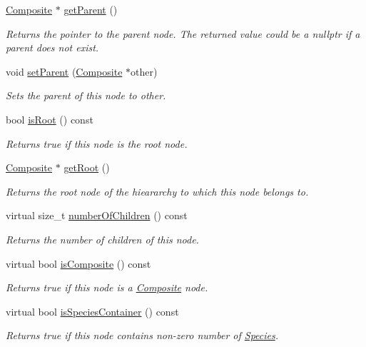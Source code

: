 \begin{DoxyCompactItemize}
\hyperlink{classComposite}{Composite} $\ast$ \hyperlink{classComponent_a4bb9041a7f3854f25f45060e81bb4e4e}{get\+Parent} ()
\begin{DoxyCompactList}\small\item\em Returns the pointer to the parent node. The returned value could be a nullptr if a parent does not exist. \end{DoxyCompactList}\item 
void \hyperlink{classComponent_a9d5b03697a653cda24d5688af1d105f8}{set\+Parent} (\hyperlink{classComposite}{Composite} $\ast$other)
\begin{DoxyCompactList}\small\item\em Sets the parent of this node to other. \end{DoxyCompactList}\item 
bool \hyperlink{classComponent_a4f0bed8144509d6565a30b548fac0fe7}{is\+Root} () const 
\begin{DoxyCompactList}\small\item\em Returns true if this node is the root node. \end{DoxyCompactList}\item 
\hyperlink{classComposite}{Composite} $\ast$ \hyperlink{classComponent_abcb3746cb8b4afcecf437dce40c0c772}{get\+Root} ()
\begin{DoxyCompactList}\small\item\em Returns the root node of the hieararchy to which this node belongs to. \end{DoxyCompactList}\item 
virtual size\+\_\+t \hyperlink{classComponent_a42566ba7ad92afe0d84d9d1d4e05745e}{number\+Of\+Children} () const 
\begin{DoxyCompactList}\small\item\em Returns the number of children of this node. \end{DoxyCompactList}\item 
virtual bool \hyperlink{classComponent_a14bcb60799865752cd293fba2076d84a}{is\+Composite} () const 
\begin{DoxyCompactList}\small\item\em Returns true if this node is a \hyperlink{classComposite}{Composite} node. \end{DoxyCompactList}\item 
virtual bool \hyperlink{classComponent_a0daf865ff32aff9e68316c65b681cbf9}{is\+Species\+Container} () const 
\begin{DoxyCompactList}\small\item\em Returns true if this node contains non-\/zero number of \hyperlink{classSpecies}{Species}. \end{DoxyCompactList}\item 

\end{DoxyCompactItemize}
